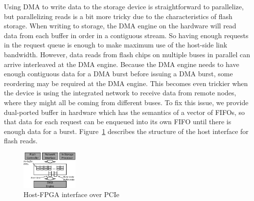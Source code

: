 Using DMA to write data to the storage device is straightforward to parallelize,
but parallelizing reads is a bit more tricky due to the characteristics of flash
storage. When writing to storage, the DMA engine on the hardware will read data
from each buffer in order in a contiguous stream. So having enough requests in
the request queue is enough to make maximum use of the host-side link bandwidth.
However, data reads from flash chips on multiple buses in parallel can arrive
interleaved at the DMA engine. Because the DMA engine needs to have enough
contiguous data for a DMA burst before issuing a DMA burst, some reordering may
be required at the DMA engine. This becomes even trickier when the device is
using the integrated network to receive data from remote nodes, where they might
all be coming from different buses. To fix this issue, we provide dual-ported
buffer in hardware which has the semantics of a vector of FIFOs, so that data
for each request can be enqueued into its own FIFO until there is enough data
for a burst.
Figure~\ref{fig:hostinterface} describes the structure of the host interface for
flash reads.

\begin{figure}[t!]
	\centering
	\includegraphics[width=0.25\textwidth]{figures/dmawrite-crop.pdf}
	\caption{Host-FPGA interface over PCIe}
	\label{fig:hostinterface}
\end{figure}

